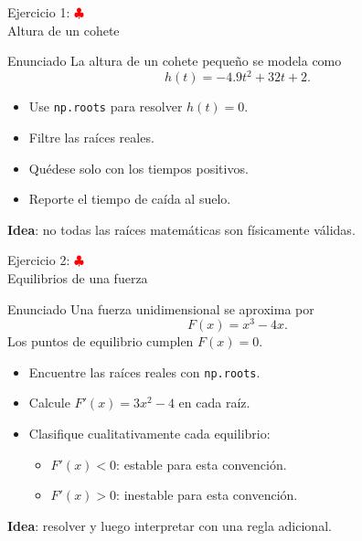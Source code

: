 \documentclass[10pt]{beamer}
\begin{document}
\begin{frame}{Ejercicio 1: \hfill \textcolor{red}{$\clubsuit$} \\ Altura de un cohete}
  \begin{block}{Enunciado}
    La altura de un cohete pequeño se modela como
    \[
      h(t) = -4.9t^2 + 32t + 2.
    \]
    \begin{itemize}
      \item Use \texttt{np.roots} para resolver \(h(t)=0\).
      \item Filtre las raíces reales.
      \item Quédese solo con los tiempos positivos.
      \item Reporte el tiempo de caída al suelo.
    \end{itemize}
  \end{block}

  \textbf{Idea}: no todas las raíces matemáticas son físicamente válidas.
\end{frame}

\begin{frame}{Ejercicio 2: \hfill \textcolor{red}{$\clubsuit$} \\ Equilibrios de una fuerza}
  \begin{block}{Enunciado}
    Una fuerza unidimensional se aproxima por
    \[
      F(x) = x^3 - 4x.
    \]
    Los puntos de equilibrio cumplen \(F(x)=0\).
    \begin{itemize}
      \item Encuentre las raíces reales con \texttt{np.roots}.
      \item Calcule \(F'(x)=3x^2-4\) en cada raíz.
      \item Clasifique cualitativamente cada equilibrio:
        \begin{itemize}
          \item \(F'(x)<0\): estable para esta convención.
          \item \(F'(x)>0\): inestable para esta convención.
        \end{itemize}
    \end{itemize}
  \end{block}

  \textbf{Idea}: resolver y luego interpretar con una regla adicional.
\end{frame}
\end{document}
